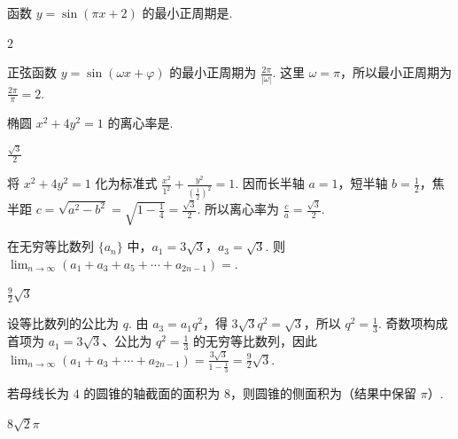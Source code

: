 \documentclass[UTF8,a4paper,oneside,11pt]{ctexbook}
\begin{document}
\begin{problem}
函数 \(y = \sin(\pi x + 2)\) 的最小正周期是\fillinblank{}.
\end{problem}

\begin{answer}
\(2\)
\end{answer}

\begin{solution}
正弦函数 \(y=\sin(\omega x+\varphi)\) 的最小正周期为 \(\frac{2\pi}{|\omega|}\). 这里 \(\omega=\pi\)，所以最小正周期为 \(\frac{2\pi}{\pi}=2\).
\end{solution}

\begin{problem}
椭圆 \(x^2 + 4y^2 = 1\) 的离心率是\fillinblank{}.
\end{problem}

\begin{answer}
\(\frac{\sqrt{3}}{2}\)
\end{answer}

\begin{solution}
将 \(x^2+4y^2=1\) 化为标准式 \(\frac{x^2}{1^2}+\frac{y^2}{(\frac12)^2}=1\). 因而长半轴 \(a=1\)，短半轴 \(b=\frac12\)，焦半距 \(c=\sqrt{a^2-b^2}=\sqrt{1-\frac14}=\frac{\sqrt3}{2}\). 所以离心率为 \(\frac ca=\frac{\sqrt3}{2}\).
\end{solution}

\begin{problem}
在无穷等比数列 \(\{a_n\}\) 中，\(a_1 = 3\sqrt{3}\)，\(a_3 = \sqrt{3}\). 则 \(\displaystyle\lim_{n \to \infty}(a_1 + a_3 + a_5 + \cdots + a_{2n-1}) =\)\fillinblank{}.
\end{problem}

\begin{answer}
\(\frac{9}{2}\sqrt{3}\)
\end{answer}

\begin{solution}
设等比数列的公比为 \(q\). 由 \(a_3=a_1q^2\)，得 \(3\sqrt3q^2=\sqrt3\)，所以 \(q^2=\frac13\). 奇数项构成首项为 \(a_1=3\sqrt3\)、公比为 \(q^2=\frac13\) 的无穷等比数列，因此
\(\displaystyle\lim_{n\to\infty}(a_1+a_3+\cdots+a_{2n-1})=\frac{3\sqrt3}{1-\frac13}=\frac92\sqrt3\).
\end{solution}

\begin{problem}
若母线长为 \(4\) 的圆锥的轴截面的面积为 \(8\)，则圆锥的侧面积为\fillinblank{}（结果中保留 \(\pi\)）.
\end{problem}

\begin{answer}
\(8\sqrt{2}\pi\)
\end{answer}
\end{document}
